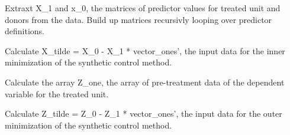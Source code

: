 \documentclass[a4paper,11pt,english]{sphinxmanual}
\begin{document}
\begin{fulllineitems}
\label{analysis:src.analysis.synthetic_control.get_x_one_and_x_zero_from_data}
Extraxt X\_1 and x\_0, the matrices of predictor values for treated unit
and donors from the data. Build up matrices recursivly looping over
predictor definitions.

\end{fulllineitems}


\begin{fulllineitems}
\label{analysis:src.analysis.synthetic_control.get_x_tilde}
Calculate X\_tilde = X\_0 - X\_1 * vector\_ones', the input data for the
inner minimization of the synthetic control method.

\end{fulllineitems}


\begin{fulllineitems}
\label{analysis:src.analysis.synthetic_control.get_z_one_from_data}
Calculate the array Z\_one, the array of pre-treatment data of the
dependent variable for the treated unit.

\end{fulllineitems}


\begin{fulllineitems}
\label{analysis:src.analysis.synthetic_control.get_z_tilde}
Calculate Z\_tilde = Z\_0 - Z\_1 * vector\_ones', the input data for the
outer minimization of the synthetic control method.

\end{fulllineitems}
\end{document}
